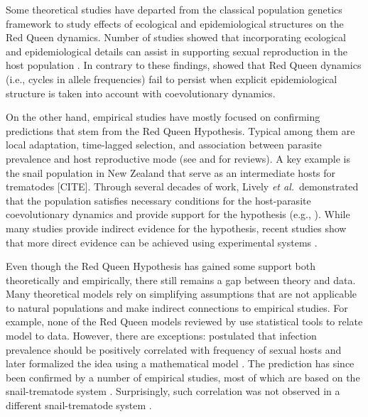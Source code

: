 \documentclass{article}\usepackage[]{graphicx}\usepackage[]{color}
\newcommand{\etal}{\textit{et al.}}
\begin{document}
Some theoretical studies have departed from the classical population genetics framework to study effects of ecological and epidemiological structures on the Red Queen dynamics.
Number of studies showed that incorporating ecological and epidemiological details can assist in supporting sexual reproduction in the host population \citep{galvani2001antigenic, galvani2003maintenance, lively2009maintenance, lively2010epidemiological}.
In contrary to these findings, \cite{macpherson2017joint} showed that Red Queen dynamics (i.e., cycles in allele frequencies) fail to persist when explicit epidemiological structure is taken into account with coevolutionary dynamics.

On the other hand, empirical studies have mostly focused on confirming predictions that stem from the Red Queen Hypothesis.
Typical among them are local adaptation, time-lagged selection, and association between parasite prevalence and host reproductive mode (see \cite{tobler2008expanding} and \cite{vergara2014infection} for reviews).
A key example is the snail population in New Zealand that serve as an intermediate hosts for trematodes [CITE].
Through several decades of work, Lively \etal\ demonstrated that the population satisfies necessary conditions for the host-parasite coevolutionary dynamics and provide support for the hypothesis (e.g., \cite{lively1987evidence, lively1989adaptation, dybdahl1995host, dybdahl1998host, jokela2009maintenance, vergara2014infection, gibson2016within}).
While many studies provide indirect evidence for the hypothesis, 
recent studies show that more direct evidence can be achieved using experimental systems \citep{auld2016sex, slowinski2016coevolutionary}.

Even though the Red Queen Hypothesis has gained some support both theoretically and empirically, there still remains a gap between theory and data.
Many theoretical models rely on simplifying assumptions that are not applicable to natural populations and make indirect connections to empirical studies.
For example, none of the Red Queen models reviewed by \cite{ashby2015diversity} use statistical tools to relate model to data.
However, there are exceptions:
\cite{lively1992parthenogenesis} postulated that infection prevalence should be positively correlated with frequency of sexual hosts and later formalized the idea using a mathematical model \citep{lively2001trematode}.
The prediction has since been confirmed by a number of empirical studies, most of which are based on the snail-trematode system \citep{lively2002temporal, kumpulainen2004parasites, vergara2013geographic, mckone2016fine, gibson2016within}.
Surprisingly, such correlation was not observed in a different snail-trematode system \citep{dagan2013clonal}.
\end{document}
